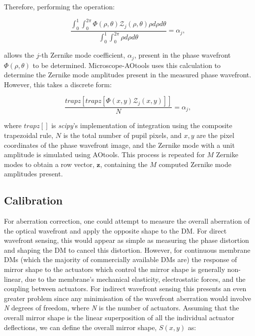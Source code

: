 Therefore, performing the operation:

\begin{equation}\label{eq:zernike_amp_extraction}
\frac{\int_{0}^{1}\int_{0}^{2\pi}\Phi\left(\rho,\theta\right)\mathcal{Z}_{j}\left(\rho,\theta\right)\rho d\rho d\theta}{\int_{0}^{1}\int_{0}^{2\pi}\rho d\rho d\theta} = \alpha_{j},
\end{equation}

allows the $j$-th Zernike mode coefficient, $\alpha_{j}$, present in the 
phase wavefront $\Phi\left(\rho,\theta\right)$ to be determined. 
Microscope-AOtools uses this calculation to determine the Zernike mode 
amplitudes present in the measured phase wavefront. However, this takes a 
discrete form:

\begin{equation}\label{eq:zernike_amp_extraction_discrete}
\frac{trapz\left[trapz\left[\Phi\left(x,y\right)\mathcal{Z}_{j}\left(x,y\right)\right]\right]}{N} = \alpha_{j},
\end{equation}

where $trapz[]$ is \textit{scipy}'s implementation of integration using the 
composite trapezoidal rule, $N$ is the total number of pupil pixels, and 
$x,y$ are the pixel coordinates of the phase wavefront image, and the Zernike 
mode with a unit amplitude is simulated using 
AOtools\cite{virtanen2020scipy,townson2019aotools}. This process is repeated 
for $M$ Zernike modes to obtain a row vector, $\boldsymbol{z}$, containing the 
$M$ computed Zernike mode amplitudes present.

\subsection{Calibration}
\label{subsec:calibration}

For aberration correction, one could attempt to measure the overall aberration of the optical wavefront and apply the opposite shape to the DM. For direct wavefront sensing, this would appear as simple as measuring the phase distortion and shaping the DM to cancel this distortion. However, for continuous membrane DMs (which the majority of commercially available DMs are) the response of mirror shape to the actuators which control the mirror shape is generally non-linear, due to the membrane's mechanical elasticity, electrostatic forces, and the coupling between actuators\cite{Zhu:99}. For indirect wavefront sensing this presents an even greater problem since any minimisation of the wavefront aberration would involve \textit{N} degrees of freedom, where \textit{N} is the number of actuators. Assuming that the overall mirror shape is the linear 
superposition of all the individual actuator deflections, we can 
define the overall mirror shape, $S(x,y)$ as:

